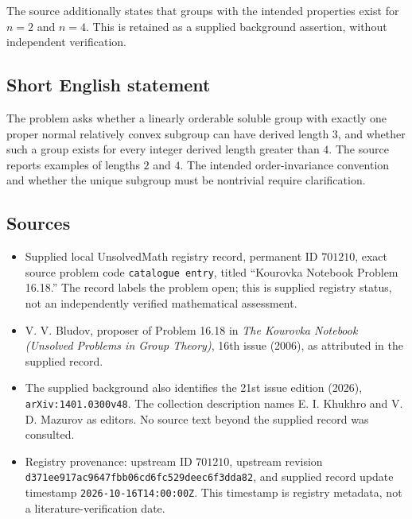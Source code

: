 \documentclass[11pt]{article}
\begin{document}
The source additionally states that groups with the intended properties exist for \(n=2\) and \(n=4\). This is retained as a supplied background assertion, without independent verification.
\subsection{Short English statement}
The problem asks whether a linearly orderable soluble group with exactly one proper normal relatively convex subgroup can have derived length \(3\), and whether such a group exists for every integer derived length greater than \(4\). The source reports examples of lengths \(2\) and \(4\). The intended order-invariance convention and whether the unique subgroup must be nontrivial require clarification.
\subsection{Sources}
\begin{itemize}
\item Supplied local UnsolvedMath registry record, permanent ID \(701210\), exact source problem code \texttt{catalogue entry}, titled ``Kourovka Notebook Problem 16.18.'' The record labels the problem open; this is supplied registry status, not an independently verified mathematical assessment.
\item V. V. Bludov, proposer of Problem 16.18 in \emph{The Kourovka Notebook (Unsolved Problems in Group Theory)}, 16th issue (2006), as attributed in the supplied record.
\item The supplied background also identifies the 21st issue edition (2026), \texttt{arXiv:1401.0300v48}. The collection description names E. I. Khukhro and V. D. Mazurov as editors. No source text beyond the supplied record was consulted.
\item Registry provenance: upstream ID \(701210\), upstream revision \texttt{d371ee917ac9647fbb06cd6fc529deec6f3dda82}, and supplied record update timestamp \texttt{2026-10-16T14:00:00Z}. This timestamp is registry metadata, not a literature-verification date.
\end{itemize}
\end{document}
